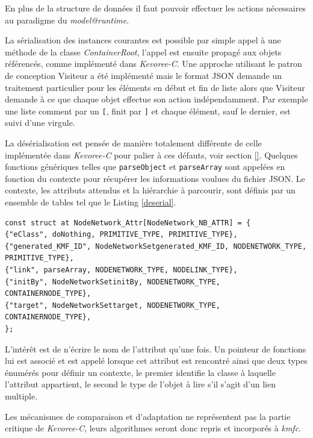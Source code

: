 En plus de la structure de données il faut pouvoir effectuer les actions nécessaires au paradigme du \emph{model@runtime}.

La sérialisation des instances courantes est possible par simple appel à une méthode de la classe \emph{ContainerRoot}, l'appel est ensuite propagé aux objets référencés, comme implémenté dans \emph{Kevoree-C}. Une approche utilisant le patron de conception Visiteur\cite{freeman2004head} a été implémenté mais le format JSON demande un traitement particulier pour les éléments en début et fin de liste alors que Visiteur demande à ce que chaque objet effectue son action indépendamment. Par exemple une liste comment par un \texttt{[}, finit par \texttt{]} et chaque élément, sauf le dernier, est suivi d'une virgule.

La désérialisation est pensée de manière totalement différente de celle implémentée dans \emph{Kevoree-C} pour palier à ces défauts, voir section \ref{}. Quelques fonctions génériques telles que \texttt{parseObject} et \texttt{parseArray} sont appelées en fonction du contexte pour récupérer les informations voulues du fichier JSON. Le contexte, les attributs attendus et la hiérarchie à parcourir, sont définis par un ensemble de tables tel que le Listing \ref{deserial}.


\begin{lstlisting}[frame=single, label={deserial}]
const struct at NodeNetwork_Attr[NodeNetwork_NB_ATTR] = {
{"eClass", doNothing, PRIMITIVE_TYPE, PRIMITIVE_TYPE},
{"generated_KMF_ID", NodeNetworkSetgenerated_KMF_ID, NODENETWORK_TYPE, PRIMITIVE_TYPE},
{"link", parseArray, NODENETWORK_TYPE, NODELINK_TYPE},
{"initBy", NodeNetworkSetinitBy, NODENETWORK_TYPE, CONTAINERNODE_TYPE},
{"target", NodeNetworkSettarget, NODENETWORK_TYPE, CONTAINERNODE_TYPE},
};
\end{lstlisting}

L'intérêt est de n'écrire le nom de l'attribut qu'une fois.
Un pointeur de fonctions lui est associé et est appelé lorsque cet attribut est rencontré ainsi que deux types énumérés pour définir un contexte, le premier identifie la classe à laquelle l'attribut appartient, le second le type de l'objet à lire s'il s'agit d'un lien multiple.

Les mécanismes de comparaison et d'adaptation ne représentent pas la partie critique de \emph{Kevoree-C}, leurs algorithmes seront donc repris et incorporés à \emph{kmfc}.

